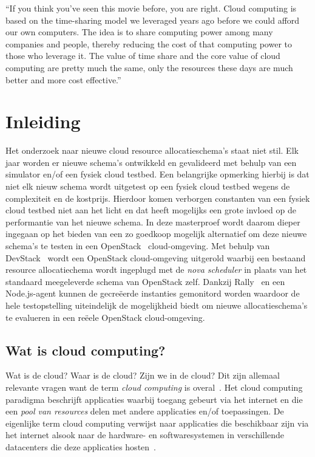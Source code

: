\begin{savequote}[0.55\linewidth]
	``If you think you've seen this movie before, you are right. Cloud computing is based on the time-sharing model we leveraged years ago before we could afford our own computers. The idea is to share computing power among many companies and people, thereby reducing the cost of that computing power to those who leverage it. The value of time share and the core value of cloud computing are pretty much the same, only the resources these days are much better and more cost effective.''
\end{savequote}

\chapter{Inleiding}
\label{chap:intro}

Het onderzoek naar nieuwe cloud resource allocatieschema's staat niet stil. Elk jaar worden er nieuwe schema's ontwikkeld en gevalideerd met behulp van een simulator en/of een fysiek cloud testbed. Een belangrijke opmerking hierbij is dat niet elk nieuw schema wordt uitgetest op een fysiek cloud testbed wegens de complexiteit en de kostprijs. Hierdoor komen verborgen constanten van een fysiek cloud testbed niet aan het licht en dat heeft mogelijks een grote invloed op de performantie van het nieuwe schema. In deze masterproef wordt daarom dieper ingegaan op het bieden van een zo goedkoop mogelijk alternatief om deze nieuwe schema's te testen in een OpenStack~\cite{OpenStack2017} cloud-omgeving. Met behulp van DevStack~\cite{OpenStack2017a} wordt een OpenStack cloud-omgeving uitgerold waarbij een bestaand resource allocatiechema wordt ingeplugd met de \textit{nova scheduler} in plaats van het standaard meegeleverde schema van OpenStack zelf. Dankzij Rally~\cite{OpenStack2017b} en een Node.js-agent kunnen de gecreëerde instanties gemonitord worden waardoor de hele testopstelling uiteindelijk de mogelijkheid biedt om nieuwe allocatieschema's te evalueren in een reëele OpenStack cloud-omgeving.

\section{Wat is cloud computing?}
\label{sec:what_is_cloud_computing}

Wat is de cloud? Waar is de cloud? Zijn we in de cloud? Dit zijn allemaal relevante vragen want de term \textit{cloud computing} is overal~\cite{Griffith2016}.
Het cloud computing paradigma beschrijft applicaties waarbij toegang gebeurt via het internet en die een \textit{pool van resources} delen met andere applicaties en/of toepassingen. De eigenlijke term cloud computing verwijst naar applicaties die beschikbaar zijn via het internet alsook naar de hardware- en softwaresystemen in verschillende datacenters die deze applicaties hosten~\cite{Jennings2015}.

